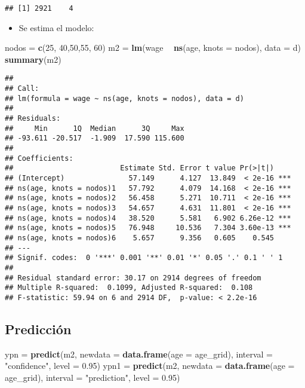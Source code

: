 \documentclass[
]{article}
\newenvironment{Shaded}{\begin{snugshade}}{\end{snugshade}}
\newcommand{\DataTypeTok}[1]{\textcolor[rgb]{0.13,0.29,0.53}{#1}}
\newcommand{\DecValTok}[1]{\textcolor[rgb]{0.00,0.00,0.81}{#1}}
\newcommand{\FloatTok}[1]{\textcolor[rgb]{0.00,0.00,0.81}{#1}}
\newcommand{\KeywordTok}[1]{\textcolor[rgb]{0.13,0.29,0.53}{\textbf{#1}}}
\newcommand{\NormalTok}[1]{#1}
\newcommand{\OperatorTok}[1]{\textcolor[rgb]{0.81,0.36,0.00}{\textbf{#1}}}
\newcommand{\StringTok}[1]{\textcolor[rgb]{0.31,0.60,0.02}{#1}}
\providecommand{\tightlist}{%
  \setlength{\itemsep}{0pt}\setlength{\parskip}{0pt}}
\begin{document}
\begin{verbatim}
## [1] 2921    4
\end{verbatim}

\begin{itemize}
\tightlist
\item
  Se estima el modelo:
\end{itemize}

\begin{Shaded}
\begin{Highlighting}[]
\NormalTok{nodos =}\StringTok{ }\KeywordTok{c}\NormalTok{(}\DecValTok{25}\NormalTok{, }\DecValTok{40}\NormalTok{,}\DecValTok{50}\NormalTok{,}\DecValTok{55}\NormalTok{, }\DecValTok{60}\NormalTok{)}
\NormalTok{m2 =}\StringTok{ }\KeywordTok{lm}\NormalTok{(wage }\OperatorTok{~}\StringTok{ }\KeywordTok{ns}\NormalTok{(age, }\DataTypeTok{knots =}\NormalTok{ nodos), }\DataTypeTok{data =}\NormalTok{ d)}
\KeywordTok{summary}\NormalTok{(m2)}
\end{Highlighting}
\end{Shaded}

\begin{verbatim}
## 
## Call:
## lm(formula = wage ~ ns(age, knots = nodos), data = d)
## 
## Residuals:
##     Min      1Q  Median      3Q     Max 
## -93.611 -20.517  -1.909  17.590 115.600 
## 
## Coefficients:
##                         Estimate Std. Error t value Pr(>|t|)    
## (Intercept)               57.149      4.127  13.849  < 2e-16 ***
## ns(age, knots = nodos)1   57.792      4.079  14.168  < 2e-16 ***
## ns(age, knots = nodos)2   56.458      5.271  10.711  < 2e-16 ***
## ns(age, knots = nodos)3   54.657      4.631  11.801  < 2e-16 ***
## ns(age, knots = nodos)4   38.520      5.581   6.902 6.26e-12 ***
## ns(age, knots = nodos)5   76.948     10.536   7.304 3.60e-13 ***
## ns(age, knots = nodos)6    5.657      9.356   0.605    0.545    
## ---
## Signif. codes:  0 '***' 0.001 '**' 0.01 '*' 0.05 '.' 0.1 ' ' 1
## 
## Residual standard error: 30.17 on 2914 degrees of freedom
## Multiple R-squared:  0.1099, Adjusted R-squared:  0.108 
## F-statistic: 59.94 on 6 and 2914 DF,  p-value: < 2.2e-16
\end{verbatim}

\hypertarget{predicciuxf3n}{%
\subsection{Predicción}\label{predicciuxf3n}}

\begin{Shaded}
\begin{Highlighting}[]
\NormalTok{ypn =}\StringTok{ }\KeywordTok{predict}\NormalTok{(m2, }\DataTypeTok{newdata =} \KeywordTok{data.frame}\NormalTok{(}\DataTypeTok{age =}\NormalTok{ age_grid), }\DataTypeTok{interval =} \StringTok{"confidence"}\NormalTok{, }\DataTypeTok{level =} \FloatTok{0.95}\NormalTok{)}
\NormalTok{ypn1 =}\StringTok{ }\KeywordTok{predict}\NormalTok{(m2, }\DataTypeTok{newdata =} \KeywordTok{data.frame}\NormalTok{(}\DataTypeTok{age =}\NormalTok{ age_grid), }\DataTypeTok{interval =} \StringTok{"prediction"}\NormalTok{, }\DataTypeTok{level =} \FloatTok{0.95}\NormalTok{)}
\end{Highlighting}
\end{Shaded}
\end{document}
